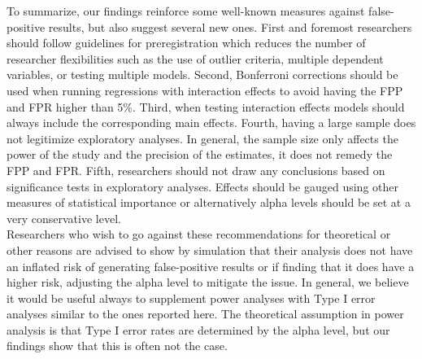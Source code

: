 To summarize, our findings reinforce some well-known measures against false-positive results, but also suggest several new ones. First and foremost researchers should follow guidelines for preregistration \citep{Nosek2015,VANTVEER20162} which reduces the number of researcher flexibilities such as the use of outlier criteria, multiple dependent variables, or testing multiple models. Second, Bonferroni corrections should be used when running regressions with interaction effects to avoid having the FPP and FPR higher than 5\%. Third, when testing interaction effects models should always include the corresponding main effects. Fourth, having a large sample does not legitimize exploratory analyses. In general, the sample size only affects the power of the study and the precision of the estimates, it does not remedy the FPP and FPR. Fifth, researchers should not draw any conclusions based on significance tests in exploratory analyses. Effects should be gauged using other measures of statistical importance or alternatively alpha levels should be set at a very conservative level. \\

Researchers who wish to go against these recommendations for theoretical or other reasons are advised to show by simulation that their analysis does not have an inflated risk of generating false-positive results or if finding that it does have a higher risk, adjusting the alpha level to mitigate the issue. In general, we believe it would be useful always to supplement power analyses with Type I error analyses similar to the ones reported here. The theoretical assumption in power analysis is that Type I error rates are determined by the alpha level, but our findings show that this is often not the case.




 

